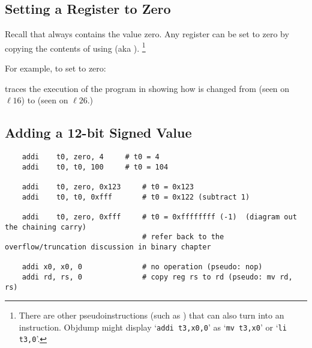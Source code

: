 

\subsection{Setting a Register to Zero}

Recall that  always contains the value zero.  Any register
can be set to zero by copying the contents of  using  
(aka ).%
\footnote{There are other pseudoinstructions (such as ) that can also 
turn into an  instruction.  Objdump might display `{\tt addi t3,x0,0}'
as `{\tt mv t3,x0}' or `{\tt li t3,0}'.}

For example, to set  to zero: 



 traces the execution of the program in 
 showing how  is changed from  
(seen on $\ell 16$) to  (seen on $\ell 26$.)




\subsection{Adding a 12-bit Signed Value}




{\small
\begin{verbatim}
    addi    t0, zero, 4     # t0 = 4
    addi    t0, t0, 100     # t0 = 104

    addi    t0, zero, 0x123     # t0 = 0x123
    addi    t0, t0, 0xfff       # t0 = 0x122 (subtract 1)

    addi    t0, zero, 0xfff     # t0 = 0xffffffff (-1)  (diagram out the chaining carry)
                                # refer back to the overflow/truncation discussion in binary chapter

	addi x0, x0, 0				# no operation (pseudo: nop)
	addi rd, rs, 0				# copy reg rs to rd (pseudo: mv rd, rs)
\end{verbatim}
}


